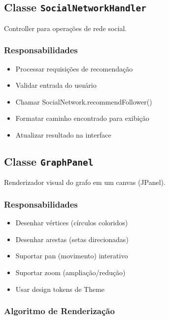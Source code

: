\documentclass[12pt,a4paper]{article}
\begin{document}
    \subsection{Classe \texttt{SocialNetworkHandler}}

    Controller para operações de rede social.

    \subsubsection{Responsabilidades}

    \begin{itemize}
        \item Processar requisições de recomendação
        \item Validar entrada do usuário
        \item Chamar SocialNetwork.recommendFollower()
        \item Formatar caminho encontrado para exibição
        \item Atualizar resultado na interface
    \end{itemize}

    \subsection{Classe \texttt{GraphPanel}}

    Renderizador visual do grafo em um canvas (JPanel).

    \subsubsection{Responsabilidades}

    \begin{itemize}
        \item Desenhar vértices (círculos coloridos)
        \item Desenhar arestas (setas direcionadas)
        \item Suportar pan (movimento) interativo
        \item Suportar zoom (ampliação/redução)
        \item Usar design tokens de Theme
    \end{itemize}

    \subsubsection{Algoritmo de Renderização}
\end{document}
